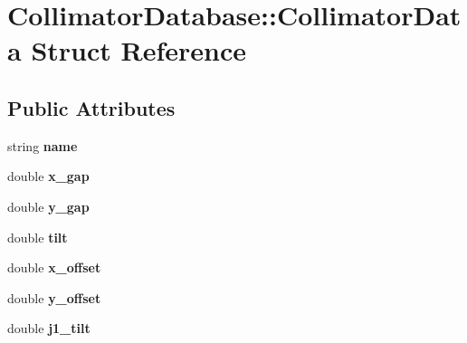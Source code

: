 \hypertarget{structCollimatorDatabase_1_1CollimatorData}{}\section{Collimator\+Database\+:\+:Collimator\+Data Struct Reference}
\label{structCollimatorDatabase_1_1CollimatorData}
\subsection*{Public Attributes}
\begin{DoxyCompactItemize}
\item 
\mbox{\label{structCollimatorDatabase_1_1CollimatorData_a1ed6a77cd58187aaf0ea722389f38f19}} 
string {\bfseries name}
\item 
\mbox{\label{structCollimatorDatabase_1_1CollimatorData_a5dc32c87ee52ab8fa3ee1621043fe934}} 
double {\bfseries x\+\_\+gap}
\item 
\mbox{\label{structCollimatorDatabase_1_1CollimatorData_ad4fd54532c669c3f6526dc2722d4b56a}} 
double {\bfseries y\+\_\+gap}
\item 
\mbox{\label{structCollimatorDatabase_1_1CollimatorData_a898c54733e84d0e3ac8616b9fe9ff0c4}} 
double {\bfseries tilt}
\item 
\mbox{\label{structCollimatorDatabase_1_1CollimatorData_a54c7282e9c967ecfc2ecc65383951146}} 
double {\bfseries x\+\_\+offset}
\item 
\mbox{\label{structCollimatorDatabase_1_1CollimatorData_a0bd7b9c424b96f27afa177b86fb88495}} 
double {\bfseries y\+\_\+offset}
\item 
\mbox{\label{structCollimatorDatabase_1_1CollimatorData_a3be4209575cfb2a1007fc6032ab23c43}} 
double {\bfseries j1\+\_\+tilt}
\item 
\mbox{\label{structCollimatorDatabase_1_1CollimatorData_a6daad4f0f91d9c8c9de32bccde4d115d}} 

\end{DoxyCompactItemize}
